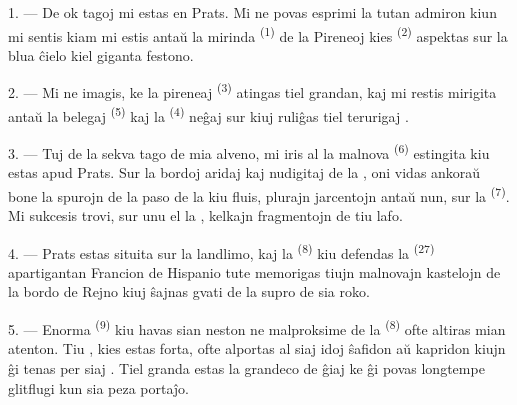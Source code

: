 
\VUsaut{4.0mm}
\VUsaut{3.0mm}

\VUsaut{3.0mm}

\VUsaut{3.0mm}

1. --- De ok tagoj mi estas en Prats. Mi ne povas esprimi la tutan admiron kiun
mi sentis kiam mi estis antaŭ la mirinda  \textsuperscript{(1)}
de la Pireneoj kies  \textsuperscript{(2)} aspektas sur la blua
ĉielo kiel giganta festono.

2. --- Mi ne imagis, ke la pireneaj  \textsuperscript{(3)}
atingas  tiel grandan, kaj mi restis mirigita antaŭ la belegaj
 \textsuperscript{(5)} kaj la 
\textsuperscript{(4)} neĝaj sur kiuj ruliĝas tiel terurigaj .

\VUsaut{3.0mm}
\VUsaut{3.0mm}

3. --- Tuj de la sekva tago de mia alveno, mi iris al la malnova 
\textsuperscript{(6)} estingita kiu estas apud Prats. Sur la bordoj aridaj kaj
nudigitaj de la , oni vidas ankoraŭ bone la spurojn de la
paso de la  kiu fluis, plurajn jarcentojn antaŭ nun, sur la
 \textsuperscript{(7)}. Mi sukcesis trovi, sur unu el
la , kelkajn fragmentojn de tiu lafo.

4. --- Prats estas situita sur la landlimo, kaj la 
\textsuperscript{(8)} kiu defendas la 
\textsuperscript{(27)} apartigantan Francion de Hispanio tute memorigas tiujn
malnovajn kastelojn de la bordo de Rejno kiuj ŝajnas gvati  de
la supro de sia roko.

5. --- Enorma  \textsuperscript{(9)} kiu havas sian neston ne
malproksime de la  \textsuperscript{(8)} ofte altiras mian
atenton. Tiu , kies  estas forta, ofte alportas
al siaj idoj ŝafidon aŭ kapridon kiujn ĝi tenas per siaj .
Tiel granda estas la grandeco de ĝiaj  ke ĝi povas longtempe
glitflugi kun sia peza portaĵo.

